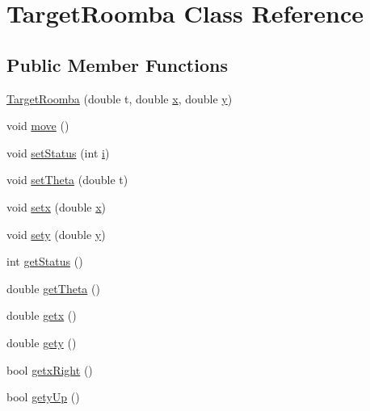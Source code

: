 \hypertarget{classTargetRoomba}{}\section{Target\+Roomba Class Reference}
\label{classTargetRoomba}
\subsection*{Public Member Functions}
\begin{DoxyCompactItemize}
\item 
\mbox{\hyperlink{classTargetRoomba_aa6fe7140d5d7df68e24a900e0622bd10}{Target\+Roomba}} (double t, double \mbox{\hyperlink{plottingTest_8cpp_aa0155849a1850c1edcfe7bce685b08f1}{x}}, double \mbox{\hyperlink{plottingTest_8cpp_a64d0474b77956c0e971da1b6cb1ddacd}{y}})
\item 
void \mbox{\hyperlink{classTargetRoomba_aa9d23db054d10261907f626f5f915913}{move}} ()
\item 
void \mbox{\hyperlink{classTargetRoomba_aa05198f7082b1480d7561dad8ce73f08}{set\+Status}} (int \mbox{\hyperlink{velTest_8cpp_a1239420b8759f52cbab64225b82461e2}{i}})
\item 
void \mbox{\hyperlink{classTargetRoomba_abe60f39d875da4194b6cc3dec1653751}{set\+Theta}} (double t)
\item 
void \mbox{\hyperlink{classTargetRoomba_adbe68bf4d207778d0a75520b3a9615ef}{setx}} (double \mbox{\hyperlink{plottingTest_8cpp_aa0155849a1850c1edcfe7bce685b08f1}{x}})
\item 
void \mbox{\hyperlink{classTargetRoomba_a254ee1a583a2c980f9e76d472febe315}{sety}} (double \mbox{\hyperlink{plottingTest_8cpp_a64d0474b77956c0e971da1b6cb1ddacd}{y}})
\item 
int \mbox{\hyperlink{classTargetRoomba_afbd797189e498b8cacdb965fc866e353}{get\+Status}} ()
\item 
double \mbox{\hyperlink{classTargetRoomba_a6cc8b96c9db2bda4bc1b6babe978b392}{get\+Theta}} ()
\item 
double \mbox{\hyperlink{classTargetRoomba_ab58023ab557011b4b495cbb715007c36}{getx}} ()
\item 
double \mbox{\hyperlink{classTargetRoomba_afed863951ef4cee3f44f74c899c3ab6f}{gety}} ()
\item 
bool \mbox{\hyperlink{classTargetRoomba_acf8c3222e1640068d2e0cfce91a31363}{getx\+Right}} ()
\item 
bool \mbox{\hyperlink{classTargetRoomba_ad1df35c81a5fe700facdca476a290ee6}{gety\+Up}} ()
\end{DoxyCompactItemize}



